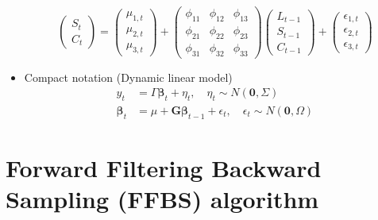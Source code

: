 \documentclass[11pt]{article}
\numberwithin{equation}{section} %
\numberwithin{figure}{section} %
\numberwithin{table}{section} %
\begin{document}
\begin{itemize}
\begin{equation}
\begin{pmatrix}
			S_{t}\\
			C_{t}
		\end{pmatrix}= \begin{pmatrix}
			\mu_{1,t}\\
			\mu_{2,t}\\
			\mu_{3,t}
		\end{pmatrix}+\begin{pmatrix}
			\phi_{11} & \phi_{12} & \phi_{13}\\
			\phi_{21} & \phi_{22} & \phi_{23}\\
			\phi_{31} & \phi_{32} & \phi_{33}
		\end{pmatrix}\begin{pmatrix}
			L_{t-1}\\
			S_{t-1}\\
			C_{t-1}
		\end{pmatrix}+\begin{pmatrix}
			\epsilon_{1,t}\\
			\epsilon_{2,t}\\
			\epsilon_{3,t}
		\end{pmatrix}
	\end{equation}
	\item Compact notation (Dynamic linear model)
	\begin{equation}
		\begin{split}
			y_{t} &= \Gamma \bm{\beta}_{t}+\eta_{t}, \quad \eta_{t} \sim N(\mathbf{0},\Sigma)\\
			\bm{\beta}_{t} &= \mu+\mathbf{G}\bm{\beta}_{t-1}+\epsilon_{t},\quad \epsilon_{t}\sim N(\mathbf{0},\Omega)
		\end{split}
	\end{equation}
\end{itemize}
\section{Forward Filtering Backward Sampling (FFBS) algorithm}
\end{document}
